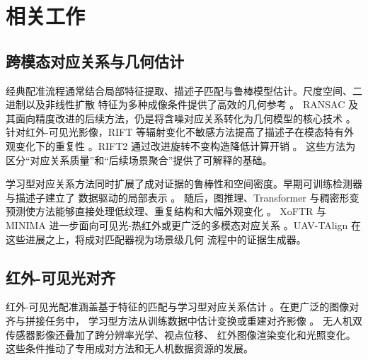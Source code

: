 
\section{相关工作}

\subsection{跨模态对应关系与几何估计}

经典配准流程通常结合局部特征提取、描述子匹配与鲁棒模型估计。尺度空间、二进制以及非线性扩散
特征为多种成像条件提供了高效的几何参考
\cite{lowe2004sift,bay2008surf,rublee2011orb,leutenegger2011brisk,alcantarilla2012kaze,alcantarilla2013akaze}。
RANSAC 及其面向精度改进的后续方法，仍是将含噪对应关系转化为几何模型的核心技术
\cite{fischler1981ransac,hartley2004multiple,barath2019magsac,barath2020magsacpp}。
针对红外-可见光影像，RIFT 等辐射变化不敏感方法提高了描述子在模态特有外观变化下的重复性
\cite{li2020rift}。RIFT2 通过改进旋转不变构造降低计算开销 \cite{li2023rift2}。
这些方法为区分“对应关系质量”和“后续场景聚合”提供了可解释的基础。

学习型对应关系方法同时扩展了成对证据的鲁棒性和空间密度。早期可训练检测器与描述子建立了
数据驱动的局部表示
\cite{detone2018superpoint,ono2018lfnet,dusmanu2019d2net,revaud2019r2d2,tyszkiewicz2020disk,germain2020s2dnet,mishchuk2017hardnet,tian2017l2net,tian2019sosnet}。
随后，图推理、Transformer 与稠密形变预测使方法能够直接处理低纹理、重复结构和大幅外观变化
\cite{sarlin2020superglue,rocco2018ncnet,zhou2021patch2pix,jiang2021cotr,sun2021loftr,chen2022aspanformer,lindenberger2023lightglue,edstedt2023dkm,edstedt2024roma,wang2024efficientloftr,jiang2024omniglue}。
XoFTR 与 MINIMA 进一步面向可见光-热红外或更广泛的多模态对应关系
\cite{tuzcuoglu2024xoftr,ren2025minima}。UAV-TAlign 在这些进展之上，将成对匹配器视为场景级几何
流程中的证据生成器。

\subsection{红外-可见光对齐}

红外-可见光配准涵盖基于特征的匹配与学习型对应关系估计
\cite{li2020rift,li2023rift2,tuzcuoglu2024xoftr,ren2025minima}。在更广泛的图像对齐与拼接任务中，
学习型方法从训练数据中估计变换或重建对齐影像 \cite{chang2017clkn,nie2021udis}。
无人机双传感器影像还叠加了跨分辨率光学、视点位移、
红外图像渲染变化和光照变化。这些条件推动了专用成对方法和无人机数据资源的发展。

